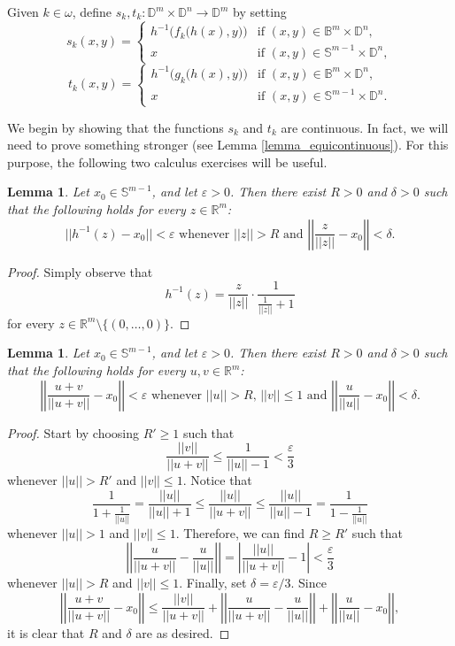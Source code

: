 \documentclass{amsart}
\theoremstyle{plain}
\newtheorem{lemma}[theorem]{Lemma}
\theoremstyle{definition}
\newcommand{\BBB}{\mathbb{B}}
\newcommand{\DDD}{\mathbb{D}}
\newcommand{\RRR}{\mathbb{R}}
\newcommand{\SSS}{\mathbb{S}}
\begin{document}
Given $k\in\omega$, define $s_k,t_k:\DDD^m\times\DDD^n\longrightarrow\DDD^m$ by setting
$$
s_k(x,y)=
\left\{
\begin{array}{ll}
h^{-1}\Big(f_k\big(h(x),y\big)\Big) & \textrm{if }(x,y)\in\BBB^m\times\DDD^n,\\
x & \textrm{if }(x,y)\in\SSS^{m-1}\times\DDD^n,
\end{array}
\right.
$$
$$
t_k(x,y)=
\left\{
\begin{array}{ll}
h^{-1}\Big(g_k\big(h(x),y\big)\Big) & \textrm{if }(x,y)\in\BBB^m\times\DDD^n,\\
x & \textrm{if }(x,y)\in\SSS^{m-1}\times\DDD^n.
\end{array}
\right.
$$

We begin by showing that the functions $s_k$ and $t_k$ are continuous. In fact, we will need to prove something stronger (see Lemma \ref{lemma_equicontinuous}). For this purpose, the following two calculus exercises will be useful.

\begin{lemma}\label{lemma_convergence_easy}
Let $x_0\in\SSS^{m-1}$, and let $\varepsilon>0$. Then there exist $R>0$ and $\delta>0$ such that the following holds for every $z\in\RRR^m$:
$$
||h^{-1}(z)-x_0||<\varepsilon\text{ whenever }||z||>R\text{ and }\left|\left|\frac{z}{||z||}-x_0\right|\right|<\delta.
$$
\end{lemma}
\begin{proof}
Simply observe that
$$
h^{-1}(z)=\frac{z}{||z||}\cdot\frac{1}{\frac{1}{||z||}+1}
$$
for every $z\in\RRR^m\setminus\{(0,\ldots,0)\}$.
\end{proof}

\begin{lemma}\label{lemma_convergence_hard}
Let $x_0\in\SSS^{m-1}$, and let $\varepsilon>0$. Then there exist $R>0$ and $\delta>0$ such that the following holds for every $u,v\in\RRR^m$:
$$
\left|\left|\frac{u+v}{||u+v||}-x_0\right|\right|<\varepsilon\text{ whenever }||u||>R\text{, }||v||\leq 1\text{ and }\left|\left|\frac{u}{||u||}-x_0\right|\right|<\delta.
$$
\end{lemma}
\begin{proof}
Start by choosing $R'\geq 1$ such that
$$
\frac{||v||}{||u+v||}\leq\frac{1}{||u||-1}<\frac{\varepsilon}{3}
$$
whenever $||u||>R'$ and $||v||\leq 1$. Notice that
$$
\frac{1}{1+\frac{1}{||u||}}=\frac{||u||}{||u||+1}\leq\frac{||u||}{||u+v||}\leq\frac{||u||}{||u||-1}=\frac{1}{1-\frac{1}{||u||}}
$$
whenever $||u||>1$ and $||v||\leq 1$. Therefore, we can find $R\geq R'$ such that
$$
\left|\left|\frac{u}{||u+v||}-\frac{u}{||u||}\right|\right|=\left|\frac{||u||}{||u+v||}-1\right|<\frac{\varepsilon}{3}
$$
whenever $||u||>R$ and $||v||\leq 1$. Finally, set $\delta=\varepsilon/3$. Since
$$
\left|\left|\frac{u+v}{||u+v||}-x_0\right|\right|\leq\frac{||v||}{||u+v||}+\left|\left|\frac{u}{||u+v||}-\frac{u}{||u||}\right|\right|+\left|\left|\frac{u}{||u||}-x_0\right|\right|,
$$
it is clear that $R$ and $\delta$ are as desired.
\end{proof}
\end{document}
